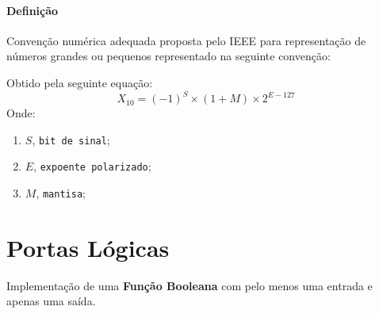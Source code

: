 \documentclass{article}
\begin{document}
                \paragraph{Definição}Convenção numérica adequada proposta pelo IEEE para representação de números grandes ou pequenos representado na seguinte convenção:
                    \begin{figure}[H]
                        \centering
                    \end{figure}\noindent
                Obtido pela seguinte equação:
                    \begin{equation}
                        \boxed{
                            X_{10} = (-1)^{S}\times(1+M)\times 2^{E-127}
                        }
                    \end{equation}
                Onde:
                    \begin{enumerate}[noitemsep]
                        \item $S$, \texttt{bit de sinal};
                        \item $E$, \texttt{expoente polarizado};
                        \item $M$, \texttt{mantisa};
                    \end{enumerate}

    \section{Portas Lógicas}
        \begin{definition}
            Implementação de uma \textbf{Função Booleana} com pelo menos uma entrada e apenas uma saída.
        \end{definition}
\end{document}
